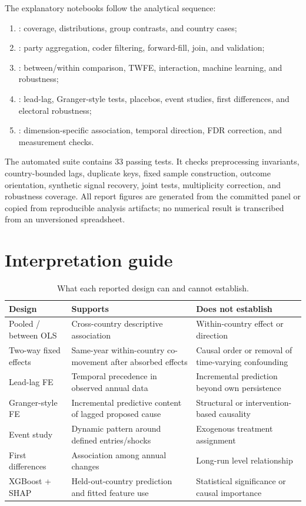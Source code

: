 The explanatory notebooks follow the analytical sequence:

\begin{enumerate}
  \item {}: coverage, distributions, group contrasts,
  and country cases;
  \item {}: party aggregation, coder filtering, forward-fill, join,
  and validation;
  \item {}: between/within comparison, TWFE, interaction, machine
  learning, and robustness;
  \item {}: lead-lag, Granger-style tests, placebos, event studies,
  first differences, and electoral robustness;
  \item {}: dimension-specific association, temporal
  direction, FDR correction, and measurement checks.
\end{enumerate}

The automated suite contains 33 passing tests. It checks preprocessing invariants, country-bounded
lags, duplicate keys, fixed sample construction, outcome orientation, synthetic signal recovery,
joint tests, multiplicity correction, and robustness coverage. All report figures are generated from
the committed panel or copied from reproducible analysis artifacts; no numerical result is transcribed
from an unversioned spreadsheet.

\section{Interpretation guide}

\begin{table}[H]
\centering
\caption{What each reported design can and cannot establish.}
\small
\begin{tabularx}{\textwidth}{>{\raggedright\arraybackslash}p{3.2cm}YY}
\toprule
Design & Supports & Does not establish \\
\midrule
Pooled / between OLS & Cross-country descriptive association & Within-country effect or direction \\
Two-way fixed effects & Same-year within-country co-movement after absorbed effects & Causal order or removal of time-varying confounding \\
Lead-lag FE & Temporal precedence in observed annual data & Incremental prediction beyond own persistence \\
Granger-style FE & Incremental predictive content of lagged proposed cause & Structural or intervention-based causality \\
Event study & Dynamic pattern around defined entries/shocks & Exogenous treatment assignment \\
First differences & Association among annual changes & Long-run level relationship \\
XGBoost + SHAP & Held-out-country prediction and fitted feature use & Statistical significance or causal importance \\
\bottomrule
\end{tabularx}
\end{table}

